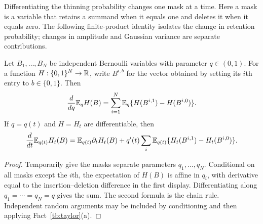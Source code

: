 Differentiating the thinning probability changes one mask at a time.
Here a mask is a variable that retains a summand when it equals one
and deletes it when it equals zero. The following finite-product identity
isolates the change in retention probability; changes in amplitude and
Gaussian variance are separate contributions.

\begin{fact}\label{tb:bernoulli}
Let \(B_1,\ldots,B_N\) be independent Bernoulli variables with parameter
\(q\in(0,1)\). For a function \(H:\{0,1\}^N\to\mathbb R\), write
\(B^{i,b}\) for the vector obtained by setting its \(i\)th entry to
\(b\in\{0,1\}\). Then
\[
 \frac{d}{dq}\mathbb E_q H(B)
 =\sum_{i=1}^N\mathbb E_q\{H(B^{i,1})-H(B^{i,0})\}.
\]
If \(q=q(t)\) and \(H=H_t\) are differentiable, then
\[
 \frac{d}{dt}\mathbb E_{q(t)}H_t(B)
 =\mathbb E_{q(t)}\partial_t H_t(B)
 +q'(t)\sum_i\mathbb E_{q(t)}
       \{H_t(B^{i,1})-H_t(B^{i,0})\}.
\]
\end{fact}

\begin{proof}
Temporarily give the masks separate parameters \(q_1,\ldots,q_N\).
Conditional on all masks except the \(i\)th, the expectation of \(H(B)\)
is affine in \(q_i\), with derivative equal to the insertion--deletion
difference in the first display. Differentiating along
\(q_1=\cdots=q_N=q\) gives the sum. The second formula is the chain
rule. Independent random arguments may be included by conditioning
and then applying Fact~\ref{tb:taylor}(a).
\end{proof}


